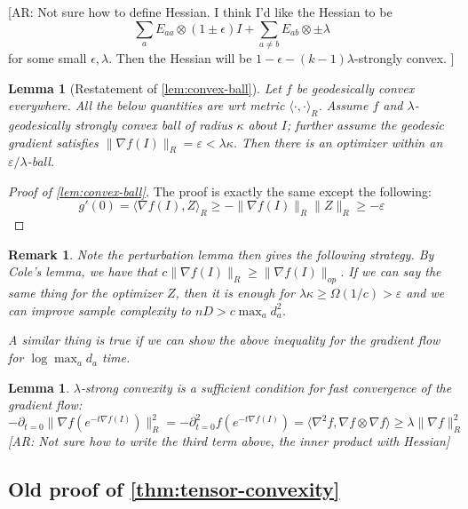 \documentclass{article}
\newtheorem{lemma}[theorem]{Lemma}
\newtheorem{remark}{Remark}
\newcommand\eps{\varepsilon}
\newcommand{\AR}[1]{{\color{orange}[AR: #1]}}
\begin{document}
\AR{Not sure how to define Hessian. I think I'd like the Hessian to be
\[  \sum_{a} E_{aa} \otimes (1 \pm \epsilon) I + \sum_{a \neq b} E_{ab} \otimes \pm \lambda  \]
for some small $\epsilon,\lambda$. Then the Hessian will be $1-\epsilon - (k-1) \lambda$-strongly convex. }



\begin{lemma} [Restatement of \cref{lem:convex-ball}]
Let $f$ be geodesically convex everywhere. All the below quantities are wrt metric $\langle \cdot, \cdot \rangle_{R}$. Assume $f$ and $\lambda$-geodesically strongly convex ball of radius $\kappa$ about $I$; further assume the geodesic gradient satisfies $\|\nabla f(I)\|_{R} = \eps < \lambda \kappa$. Then there is an optimizer within an $\eps/\lambda$-ball.
\end{lemma}
\begin{proof} [Proof of \cref{lem:convex-ball}]
The proof is exactly the same except the following:
\[ g'(0) = \langle \nabla f(I), Z \rangle_{R} \geq - \|\nabla f(I)\|_{R} \|Z\|_{R} \geq - \eps     \]
\end{proof}

\begin{remark}
Note the perturbation lemma then gives the following strategy. By Cole's lemma, we have that $c \|\nabla f(I)\|_{R} \geq \|\nabla f(I)\|_{op}$. If we can say the same thing for the optimizer $Z$, then it is enough for $\lambda \kappa \geq \Omega(1/c) > \eps$ and we can improve sample complexity to $nD > c \max_{a} d_{a}^{2}$.

A similar thing is true if we can show the above inequality for the gradient flow for $\log \max_{a} d_{a}$ time.
\end{remark}

\begin{lemma}
$\lambda$-strong convexity is a sufficient condition for fast convergence of the gradient flow:
\[ - \partial_{t=0} \|\nabla f(e^{-t\nabla f(I)})\|_{R}^{2} = -\partial_{t=0}^{2} f(e^{-t\nabla f(I)}) = \langle \nabla^{2} f, \nabla f \otimes \nabla f \rangle \geq \lambda \|\nabla f\|_{R}^{2}    \]
\AR{Not sure how to write the third term above, the inner product with Hessian}
\end{lemma}

\subsection{Old proof of \cref{thm:tensor-convexity}}
\end{document}
